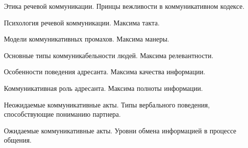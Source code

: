 \documentclass[
	14pt,
	a4paper,
	]
	{scrartcl}
\begin{document}
\vfill

\newpage


\shapk
{}
\setcounter{zad}{0}

\vfill
\z Этика речевой коммуникации.
 \vfill
\z Принцы вежливости в коммуникативном кодексе.
 \vfill

\vfill

\newpage


\shapk
{}
\setcounter{zad}{0}

\vfill
\z Психология речевой коммуникации.
 \vfill
\z Максима такта.
 \vfill

\vfill

\newpage


\shapk
{}
\setcounter{zad}{0}

\vfill
\z Модели коммуникативных промахов.
 \vfill
\z Максима манеры.
 \vfill

\vfill

\newpage


\shapk
{}
\setcounter{zad}{0}

\vfill
\z Основные типы коммуникабельности людей.
 \vfill
\z Максима релевантности.
 \vfill

\vfill

\newpage


\shapk
{}
\setcounter{zad}{0}

\vfill
\z Особенности поведения адресанта.
 \vfill
\z Максима качества информации.
 \vfill

\vfill

\newpage


\shapk
{}
\setcounter{zad}{0}

\vfill
\z Коммуникативная роль адресанта.
 \vfill
\z Максима полноты информации.
 \vfill

\vfill

\newpage


\shapk
{}
\setcounter{zad}{0}

\vfill
\z Неожидаемые коммуникативные акты.
 \vfill
\z Типы вербального поведения, способствующие пониманию партнера.
 \vfill

\vfill

\newpage


\shapk
{}
\setcounter{zad}{0}

\vfill
\z Ожидаемые коммуникативные акты.
 \vfill
\z Уровни обмена информацией в процессе общения.
 \vfill
\end{document}
